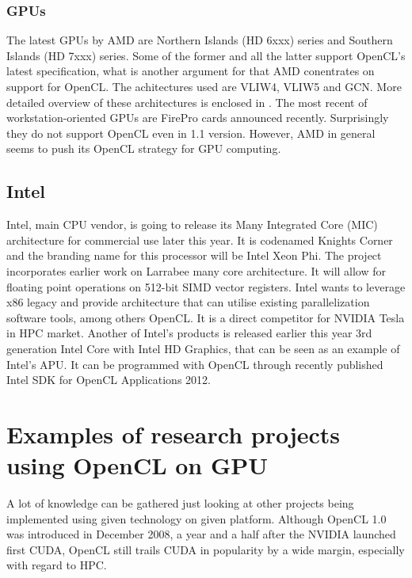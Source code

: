 \subsubsection{GPUs}
The latest GPUs by AMD are Northern Islands (HD 6xxx) series and Southern Islands (HD 7xxx) series. Some of the former and all the latter support OpenCL's latest specification, what is another argument for that AMD conentrates on support for OpenCL. The achitectures used are VLIW4, VLIW5 and GCN. More detailed overview of these architectures is enclosed in \cite{nielsen2012}. The most recent of workstation-oriented GPUs are FirePro cards announced recently. Surprisingly they do not support OpenCL even in 1.1 version. However, AMD in general seems to push its OpenCL strategy for GPU computing.


\subsection{Intel}
Intel, main CPU vendor, is going to release its Many Integrated Core (MIC) architecture for commercial use later this year. It is codenamed Knights Corner and the branding name for this processor will be Intel Xeon Phi. The project incorporates earlier work on Larrabee many core architecture. It will allow for floating point operations on 512-bit SIMD vector registers. Intel wants to leverage x86 legacy and provide architecture that can utilise existing parallelization software tools, among others OpenCL. It is a direct competitor for NVIDIA Tesla in HPC market. Another of Intel's products is released earlier this year 3rd generation Intel Core with Intel HD Graphics, that can be seen as an example of Intel's APU. It can be programmed with OpenCL through recently published Intel SDK for OpenCL Applications 2012.


\section{Examples of research projects using OpenCL on GPU}
A lot of knowledge can be gathered just looking at other projects being implemented using given technology on given platform. Although OpenCL 1.0 was introduced in December 2008, a year and a half after the NVIDIA launched first CUDA, OpenCL still trails CUDA in popularity by a wide margin, especially with regard to HPC. 



